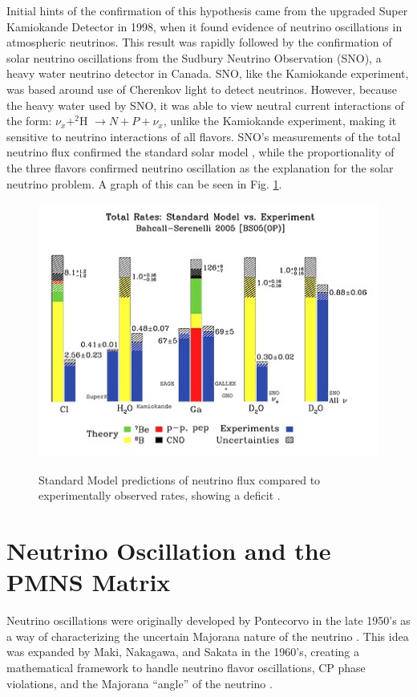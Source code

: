 Initial hints of the confirmation of this hypothesis came from the upgraded Super Kamiokande Detector in 1998, when it found evidence of neutrino oscillations in atmospheric neutrinos. This result was rapidly followed by the confirmation of solar neutrino oscillations from the Sudbury Neutrino Observation (SNO), a heavy water neutrino detector in Canada. SNO, like the Kamiokande experiment, was based around use of Cherenkov light to detect neutrinos. However, because the heavy water used by SNO, it was able to view neutral current interactions of the form: $\nu_{x} + ^{2}$H $\rightarrow N + P + \nu_{x}$,  unlike the Kamiokande experiment, making it sensitive to neutrino interactions of all flavors. SNO's measurements of the total neutrino flux confirmed the standard solar model \cite{SNO}, while the proportionality of the three flavors confirmed neutrino oscillation as the explanation for the solar neutrino problem. A graph of this can be seen in Fig. \ref{Neutrino_Problem}.

\begin{figure}
\caption{Standard Model predictions of neutrino flux compared to experimentally observed rates, showing a deficit \cite{Bahcall}.}
\includegraphics[width=\textwidth]{tex/colortheoryvsexp.jpg}
\label{Neutrino_Problem}
\end{figure}


\section{Neutrino Oscillation and the PMNS Matrix}
Neutrino oscillations were originally developed by Pontecorvo in the late 1950's as a way of characterizing the uncertain Majorana nature of the neutrino \cite{Ponte}. This idea was expanded by Maki, Nakagawa, and Sakata in the 1960's, creating a mathematical framework to handle neutrino flavor oscillations, CP phase violations, and the Majorana ``angle'' of the neutrino \cite {PMNS}. 

